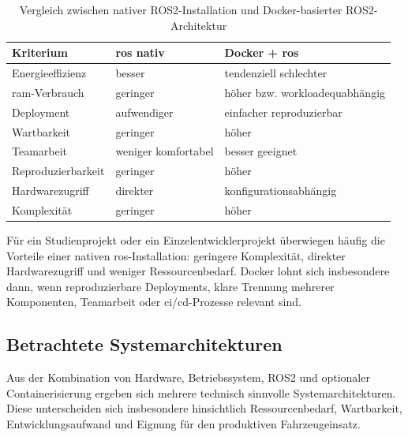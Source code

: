 \begin{table}[h]
    \centering
    \caption{Vergleich zwischen nativer ROS2-Installation und Docker-basierter ROS2-Architektur}
    \label{tab:nativ_vs_docker}
    \begin{tabular}{lll}
        \hline
        \textbf{Kriterium}  & \textbf{\gls{ros} nativ} & \textbf{Docker + \gls{ros}}    \\
        \hline
        Energieeffizienz    & besser                   & tendenziell schlechter         \\
        \gls{ram}-Verbrauch & geringer                 & höher bzw. workloadequabhängig \\
        Deployment          & aufwendiger              & einfacher reproduzierbar       \\
        Wartbarkeit         & geringer                 & höher                          \\
        Teamarbeit          & weniger komfortabel      & besser geeignet                \\
        Reproduzierbarkeit  & geringer                 & höher                          \\
        Hardwarezugriff     & direkter                 & konfigurationsabhängig         \\
        Komplexität         & geringer                 & höher                          \\
        \hline
    \end{tabular}
\end{table}

Für ein Studienprojekt oder ein Einzelentwicklerprojekt überwiegen häufig die Vorteile einer nativen \gls{ros}-Installation: geringere Komplexität, direkter Hardwarezugriff und weniger Ressourcenbedarf. Docker lohnt sich insbesondere dann, wenn reproduzierbare Deployments, klare Trennung mehrerer Komponenten, Teamarbeit oder \gls{ci/cd}-Prozesse relevant sind.

\subsection{Betrachtete Systemarchitekturen}
\label{sec:systemarchitekturen}

Aus der Kombination von Hardware, Betriebssystem, ROS2 und optionaler Containerisierung ergeben sich mehrere technisch sinnvolle Systemarchitekturen. Diese unterscheiden sich insbesondere hinsichtlich Ressourcenbedarf, Wartbarkeit, Entwicklungsaufwand und Eignung für den produktiven Fahrzeugeinsatz.

